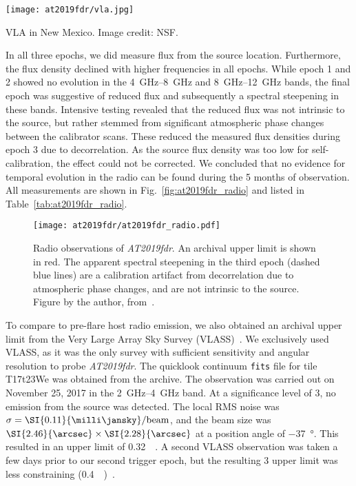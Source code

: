 \begin{marginfigure}
    \texttt{[image: at2019fdr/vla.jpg]}
    \caption[VLA]{VLA in New Mexico. Image credit: NSF.}
\end{marginfigure}

In all three epochs, we did measure flux from the source location. Furthermore, the flux density declined with higher frequencies in all epochs. While epoch 1 and 2 showed no evolution in the \SIrange{4}{8}{\giga\Hz} and \SIrange{8}{12}{\giga\Hz} bands, the final epoch was suggestive of reduced flux and subsequently a spectral steepening in these bands. Intensive testing revealed that the reduced flux was not intrinsic to the source, but rather stemmed from significant atmospheric phase changes between the calibrator scans. These reduced the measured flux densities during epoch 3 due to decorrelation. As the source flux density was too low for self-calibration, the effect could not be corrected. We concluded that no evidence for temporal evolution in the radio can be found during the 5 months of observation. All measurements are shown in Fig.~\ref{fig:at2019fdr_radio} and listed in Table~\ref{tab:at2019fdr_radio}.

\begin{figure}[htb]
    \texttt{[image: at2019fdr/at2019fdr\_radio.pdf]}
    \caption[\emph{AT2019fdr} radio observations]{Radio observations of \emph{AT2019fdr}. An archival upper limit is shown in red. The apparent spectral steepening in the third epoch (dashed blue lines) are a calibration artifact from decorrelation due to atmospheric phase changes, and are not intrinsic to the source. Figure by the author, from~\cite{Reusch2022}.}
\end{figure}

To compare to pre-flare host radio emission, we also obtained an archival upper limit from the Very Large Array Sky Survey (VLASS)~. We exclusively used VLASS, as it was the only survey with sufficient sensitivity and angular resolution to probe \emph{AT2019fdr}. The quicklook continuum \texttt{fits} file for tile T17t23We was obtained from the archive. The observation was carried out on November 25, 2017 in the \SIrange{2}{4}{\giga\Hz} band. At a significance level of \SI{3}{\sigma}, no emission from the source was detected. The local RMS noise was $\sigma=\SI{0.11}{\milli\jansky}/\text{beam}$, and the beam size was $\SI{2.46}{\arcsec} \times \SI{2.28}{\arcsec}$ at a position angle of \SI{-37}{\degree}. This resulted in an upper limit of \SI{0.32}{\milli\jansky}. A second VLASS observation was taken a few days prior to our second trigger epoch, but the resulting \SI{3}{\sigma} upper limit was less constraining (\SI{0.4}{\milli\jansky})~\cite{Reusch2022}.

